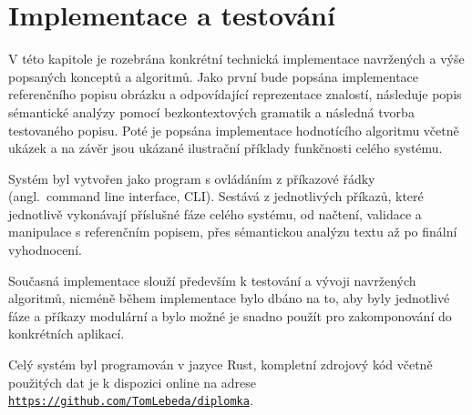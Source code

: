 \section{Implementace a testování}\label{sec:implementace}
V této kapitole je rozebrána konkrétní technická implementace navržených a výše popsaných konceptů a algoritmů.
Jako první bude popsána implementace referenčního popisu obrázku a odpovídající reprezentace znalostí,
následuje popis sémantické analýzy pomocí bezkontextových gramatik a následná tvorba testovaného popisu.
Poté je popsána implementace hodnotícího algoritmu včetně ukázek a na závěr jsou ukázané ilustrační příklady funkčnosti celého systému.

Systém byl vytvořen jako program s ovládáním z příkazové řádky (angl.~command line interface, CLI).
Sestává z jednotlivých příkazů, které jednotlivě vykonávají příslušné fáze celého systému, od načtení, validace a manipulace s referenčním popisem,
přes sémantickou analýzu textu až po finální vyhodnocení.

Současná implementace slouží především k testování a vývoji navržených algoritmů,
nicméně během implementace bylo dbáno na to, aby byly jednotlivé fáze a příkazy modulární a bylo možné je snadno
použít pro zakomponování do konkrétních aplikací.

Celý systém byl programován v jazyce Rust, kompletní zdrojový kód včetně použitých dat je k dispozici
online na adrese \href{https://github.com/TomLebeda/diplomka}{\texttt{https://github.com/TomLebeda/diplomka}}.







